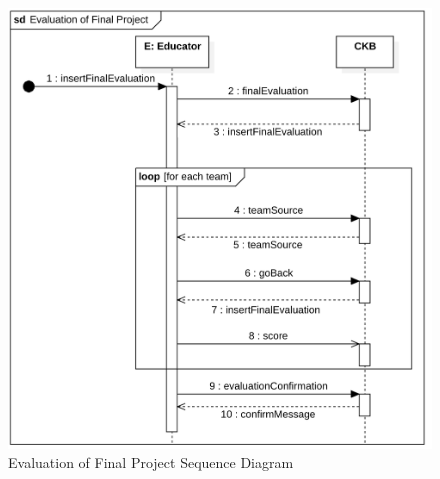 \begin{figure}[h]
    \centering
    \includegraphics[scale=0.7]{images/SD/EvaluationFinalProjectSD.png} 
    \caption{Evaluation of Final Project Sequence Diagram}
    \label{fig_EvaluationFinalProjectSD}
\end{figure}

\clearpage


